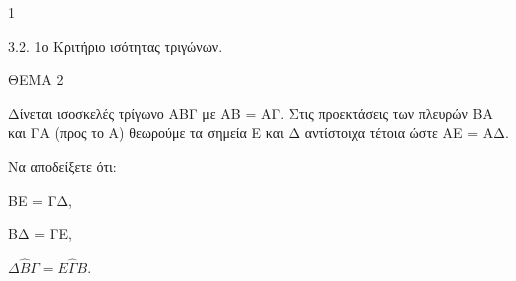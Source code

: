 \begin{ylh}{1}
    \item 3.2. 1ο Κριτήριο ισότητας τριγώνων.
\end{ylh}

ΘΕΜΑ 2

Δίνεται ισοσκελές τρίγωνο ΑΒΓ με ΑΒ = ΑΓ. Στις προεκτάσεις των πλευρών ΒΑ και ΓΑ (προς το Α) θεωρούμε τα σημεία Ε και Δ αντίστοιχα τέτοια ώστε ΑΕ = ΑΔ.

Να αποδείξετε ότι:

\begin{alist}
\item ΒΕ = ΓΔ, 

\item ΒΔ = ΓΕ, 

\item $\Delta\widehat{Β}\Gamma = Ε\widehat{\Gamma}Β$. 
\end{alist}
